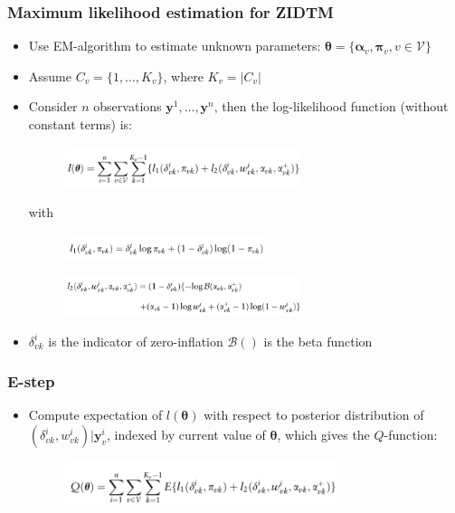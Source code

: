 \documentclass{beamer}
\begin{document}
\begin{frame}
\frametitle{Maximum likelihood estimation for ZIDTM}
\begin{itemize}
  \item Use EM-algorithm to estimate unknown parameters: $\boldsymbol\theta = \{\boldsymbol\alpha_v, \boldsymbol\pi_v, v \in \mathcal{V}\}$
  \item Assume $C_v = \{ 1,\ldots , K_v\}$, where $K_v = |C_v|$
  \item Consider $n$ observations $\boldsymbol y^1, \ldots , \boldsymbol y^n$, then the log-likelihood function (without constant terms) is:
  \begin{figure}[!htb]
	\centering
	\includegraphics[width=0.65\textwidth]{img/log_liklihood.png}
\end{figure}
with
\begin{figure}[!htb]
	\centering
	\includegraphics[width=0.55\textwidth]{img/l1.png}
\end{figure}

\begin{figure}[!htb]
	\centering
	\includegraphics[width=0.65\textwidth]{img/l2.png}
\end{figure}
\item $\delta_{vk}^i$ is the indicator of zero-inflation $\mathcal{B}()$ is the beta function
\end{itemize}

\end{frame}
\begin{frame}
\frametitle{E-step}
\begin{itemize}
  \item Compute expectation of $l(\boldsymbol\theta)$ with respect to posterior distribution of $(\delta_{vk}^i, w_{vk}^i)|\boldsymbol{y}_{v}^i$, indexed by current value of $\boldsymbol\theta$, which gives the $Q$-function:
  \begin{figure}[!htb]
	\centering
	\includegraphics[width=0.75\textwidth]{img/q.png}
\end{figure}
\end{itemize}
\end{frame}
\end{document}
